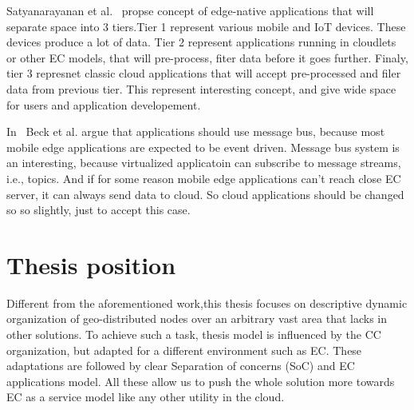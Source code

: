 Satyanarayanan et al.~\cite{SatyanarayananK19} propse concept of edge-native applications that will separate space into 3 tiers.Tier 1 represent various mobile and IoT devices. These devices produce a lot of data. Tier 2 represent applications running in cloudlets or other EC models, that will pre-process, fiter data before it goes further. Finaly, tier 3 represnet classic cloud applications that will accept pre-processed and filer data from previous tier. This represent interesting concept, and give wide space for users and application developement.

In~\cite{inproceedingsBeck} Beck et al. argue that applications should use message bus, because most mobile edge applications are expected to be event driven.  Message bus system is an interesting, because virtualized applicatoin can subscribe to message streams, i.e., topics. And if for some reason mobile edge applications can't reach close EC server, it can always send data to cloud. So cloud applications should be changed so so slightly, just to accept this case.
%
%
\section{Thesis position}\label{sec:thesis_position}
Different from the aforementioned work,this thesis focuses on descriptive dynamic organization of geo-distributed nodes over an arbitrary vast area that lacks in other solutions. To achieve such a task, thesis model is influenced by the CC organization, but adapted for a different environment such as EC. These adaptations are followed by clear Separation of concerns (SoC) and EC applications model. All these allow us to push the whole solution more towards EC as a service model like any other utility in the cloud.
%
%